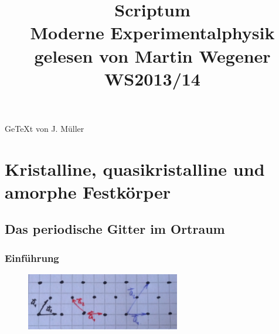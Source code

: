 \documentclass[paper=A4,12pt,pagesize,twoside,BCOR=8mm,ngerman]{scrartcl}
\title{\textnormal{Scriptum}\\ Moderne Experimentalphysik \uppercase\expandafter{\romannumeral2\relax}\\\textnormal{\large{gelesen von Martin Wegener WS2013/14}}}
\author{}
\date{}
\begin{document}
\maketitle
\vfill
\begin{center}
	\large{Ge\TeX t von J. Müller}
\end{center}
\setcounter{page}{0} 
\thispagestyle{empty}
\newpage
\tableofcontents
\newpage
{}
\section{Kristalline, quasikristalline und amorphe Festkörper}
	\subsection{Das periodische Gitter im Ortraum}
		\subsubsection{Einführung}
			\begin{figure}[H]
				\centering
				\includegraphics[width=0.6\textwidth]{pics/pic001.jpg}
			\end{figure}
					
\end{document}
